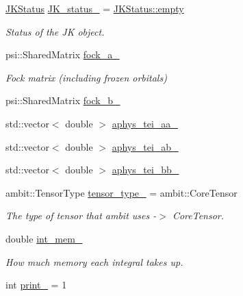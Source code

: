 \begin{DoxyCompactItemize}
\mbox{\hyperlink{classforte_1_1_forte_integrals_a5ef066e57ff1494e90669779b1d0ecc2}{J\+K\+Status}} \mbox{\hyperlink{classforte_1_1_forte_integrals_a9084872d37bee552673bb1d574527ba2}{J\+K\+\_\+status\+\_\+}} = \mbox{\hyperlink{classforte_1_1_forte_integrals_a5ef066e57ff1494e90669779b1d0ecc2aa2e4822a98337283e39f7b60acf85ec9}{J\+K\+Status\+::empty}}
\begin{DoxyCompactList}\small\item\em Status of the JK object. \end{DoxyCompactList}\item 
psi\+::\+Shared\+Matrix \mbox{\hyperlink{classforte_1_1_forte_integrals_a2d3cf66f9a6f95e365a3ba16841ee567}{fock\+\_\+a\+\_\+}}
\begin{DoxyCompactList}\small\item\em Fock matrix (including frozen orbitals) \end{DoxyCompactList}\item 
psi\+::\+Shared\+Matrix \mbox{\hyperlink{classforte_1_1_forte_integrals_ae97fe104442ec92972f450de1c032e48}{fock\+\_\+b\+\_\+}}
\item 
std\+::vector$<$ double $>$ \mbox{\hyperlink{classforte_1_1_forte_integrals_a53b95d98b262874ed8e73e17377dc6d7}{aphys\+\_\+tei\+\_\+aa\+\_\+}}
\item 
std\+::vector$<$ double $>$ \mbox{\hyperlink{classforte_1_1_forte_integrals_ab5af519ef73a625e5279a04801224b46}{aphys\+\_\+tei\+\_\+ab\+\_\+}}
\item 
std\+::vector$<$ double $>$ \mbox{\hyperlink{classforte_1_1_forte_integrals_a759f8bf4799bcaaf26fd673c92914ec4}{aphys\+\_\+tei\+\_\+bb\+\_\+}}
\item 
ambit\+::\+Tensor\+Type \mbox{\hyperlink{classforte_1_1_forte_integrals_a4dc4fef1392fb146f9585daf945e4399}{tensor\+\_\+type\+\_\+}} = ambit\+::\+Core\+Tensor
\begin{DoxyCompactList}\small\item\em The type of tensor that ambit uses -\/$>$ Core\+Tensor. \end{DoxyCompactList}\item 
double \mbox{\hyperlink{classforte_1_1_forte_integrals_aadefcdebabf54f05730574d16af787cb}{int\+\_\+mem\+\_\+}}
\begin{DoxyCompactList}\small\item\em How much memory each integral takes up. \end{DoxyCompactList}\item 
int \mbox{\hyperlink{classforte_1_1_forte_integrals_af1dfd9a5f18efa1bac5d55f1e90b4f83}{print\+\_\+}} = 1

\end{DoxyCompactItemize}
